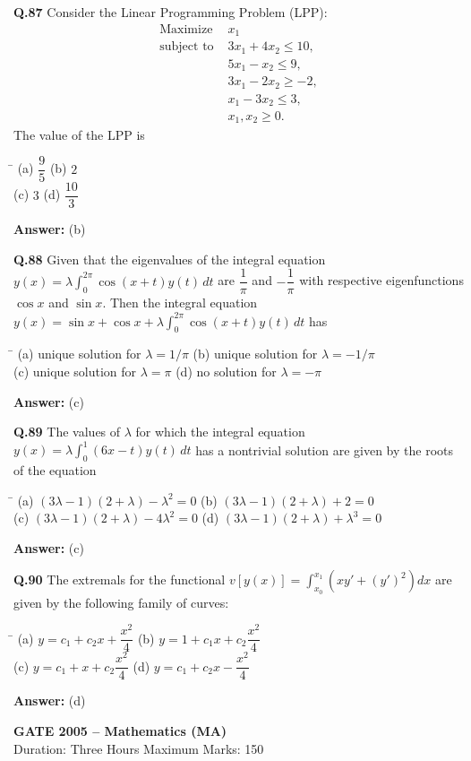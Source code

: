 \documentclass[11pt,a4paper]{article}
\newcommand{\optsfour}[4]{%
  \begin{tabbing}
    \hspace{0.48\linewidth}\=\kill
    (a) #1 \> (b) #2 \\[2pt]
    (c) #3 \> (d) #4
  \end{tabbing}%
}
\newcommand{\ans}[1]{\textbf{Answer:} #1\par\medskip}
\begin{document}
\textbf{Q.87} Consider the Linear Programming Problem (LPP):
\begin{align*}
  \text{Maximize } & x_1 \\
  \text{subject to } & 3x_1 + 4x_2 \le 10, \\
                     & 5x_1 - x_2 \le 9, \\
                     & 3x_1 - 2x_2 \ge -2, \\
                     & x_1 - 3x_2 \le 3, \\
                     & x_1, x_2 \ge 0.
\end{align*}
The value of the LPP is
\optsfour{$\dfrac{9}{5}$}{$2$}{$3$}{$\dfrac{10}{3}$}
\ans{(b)}

\textbf{Q.88} Given that the eigenvalues of the integral equation $y(x) = \lambda \displaystyle\int_0^{2\pi} \cos(x + t)y(t)\,dt$ are $\dfrac{1}{\pi}$ and $-\dfrac{1}{\pi}$ with respective eigenfunctions $\cos x$ and $\sin x$. Then the integral equation $y(x) = \sin x + \cos x + \lambda \displaystyle\int_0^{2\pi} \cos(x + t)y(t)\,dt$ has
\optsfour{unique solution for $\lambda = 1/\pi$}{unique solution for $\lambda = -1/\pi$}{unique solution for $\lambda = \pi$}{no solution for $\lambda = -\pi$}
\ans{(c)}

\textbf{Q.89} The values of $\lambda$ for which the integral equation $y(x) = \lambda \displaystyle\int_0^1 (6x - t)y(t)\,dt$ has a nontrivial solution are given by the roots of the equation
\optsfour{$(3\lambda - 1)(2 + \lambda) - \lambda^2 = 0$}{$(3\lambda - 1)(2 + \lambda) + 2 = 0$}{$(3\lambda - 1)(2 + \lambda) - 4\lambda^2 = 0$}{$(3\lambda - 1)(2 + \lambda) + \lambda^3 = 0$}
\ans{(c)}

\textbf{Q.90} The extremals for the functional $v[y(x)] = \displaystyle\int_{x_0}^{x_1} \left(xy' + (y')^2\right)dx$ are given by the following family of curves:
\optsfour{$y = c_1 + c_2 x + \dfrac{x^2}{4}$}{$y = 1 + c_1 x + c_2\dfrac{x^2}{4}$}{$y = c_1 + x + c_2\dfrac{x^2}{4}$}{$y = c_1 + c_2 x - \dfrac{x^2}{4}$}
\ans{(d)}

\newpage


\begin{center}
  {\Large\bfseries GATE 2005 -- Mathematics (MA)}\\[4pt]
  {\small Duration: Three Hours \quad\textbar\quad Maximum Marks: 150}
\end{center}
\end{document}
